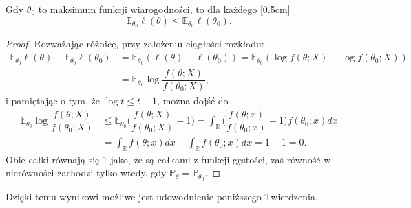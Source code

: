 \begin{lemma}\label{l:pierwszy}
Gdy $\theta_0$ to maksimum funkcji wiarogodności, to dla każdego \text{$\theta \in \Theta$}
[0.5cm]
\begin{equation*}
\mathbb{E}_{\theta_0}\ell(\theta) \leq \mathbb{E}_{\theta_0}\ell(\theta_0).
\end{equation*}
\end{lemma}

\begin{proof}
Rozważając różnicę, przy założeniu ciągłości rozkładu:
\begin{equation*}
\begin{split}
\mathbb{E}_{\theta_0}\ell(\theta) - \mathbb{E}_{\theta_0}\ell(\theta_0) & = \mathbb{E}_{\theta_0}(\ell(\theta) - \ell(\theta_0) ) = \mathbb{E}_{\theta_0}(\log f(\theta; X) - \log f(\theta_0; X)) \\
 & = \mathbb{E}_{\theta_0}\log\dfrac{f(\theta; X)}{f(\theta_0; X)},
\end{split}
\end{equation*}
i pamiętając o tym, że $\log t \leq t - 1$, można dojść do
\begin{equation*}
\begin{split}
\mathbb{E}_{\theta_0}\log\dfrac{f(\theta; X)}{f(\theta_0; X)} & \leq \mathbb{E}_{\theta_0}\Big(\dfrac{f(\theta; X)}{f(\theta_0; X)} - 1 \Big) = \int_{\mathbb{R}} \Big(\dfrac{f(\theta; x)}{f(\theta_0; x)} - 1 \Big) f(\theta_0;x) dx \\ 
& = \int_{\mathbb{R}} f(\theta;x)dx - \int_{\mathbb{R}} f(\theta_0;x)dx = 1-1 =0.
\end{split}
\end{equation*}
Obie całki równają się 1 jako, że są całkami z funkcji gęstości, zaś równość w nierówności zachodzi tylko wtedy, gdy  $\mathbb{P}_{\theta}=\mathbb{P}_{\theta_0}$.
\end{proof}

Dzięki temu wynikowi możliwe jest udowodnienie poniższego Twierdzenia.

